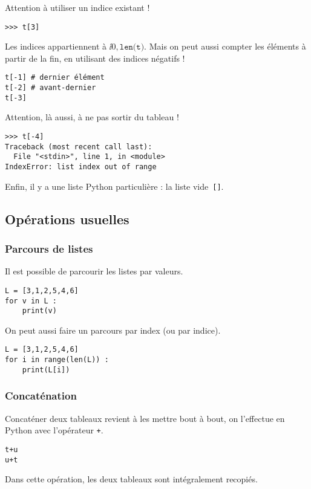 Attention à utiliser un indice existant !
\begin{lstlisting}
>>> t[3]
\end{lstlisting}

Les indices appartiennent à $\ii{0,\texttt{len(t)}}$.
Mais on peut aussi compter les éléments à partir de la fin, en utilisant des indices négatifs !
\begin{lstlisting}
t[-1] # dernier élément
t[-2] # avant-dernier
t[-3]
\end{lstlisting}

Attention, là aussi, à ne pas sortir du tableau !

\begin{lstlisting}
>>> t[-4]
Traceback (most recent call last):
  File "<stdin>", line 1, in <module>
IndexError: list index out of range
\end{lstlisting}

Enfin, il y a une liste Python particulière : la liste vide~\texttt{[]}.



\subsection{Opérations usuelles}

\subsubsection{Parcours de listes}

\begin{minipage}[c]{.47\linewidth}
Il est possible de parcourir les listes par valeurs. 
\begin{lstlisting}
L = [3,1,2,5,4,6]
for v in L : 
    print(v)
\end{lstlisting}
\end{minipage}
\hfill
\begin{minipage}[c]{.47\linewidth}
On peut aussi faire un parcours par index (ou par indice).
\begin{lstlisting}
L = [3,1,2,5,4,6]
for i in range(len(L)) : 
    print(L[i])
\end{lstlisting}
\end{minipage}


\subsubsection{Concaténation}
Concaténer deux tableaux revient à les mettre bout à bout, on l'effectue en Python avec 
l'opérateur \texttt{+}.
\begin{lstlisting}
t+u
u+t
\end{lstlisting}
Dans cette opération, les deux tableaux sont intégralement recopiés. 

